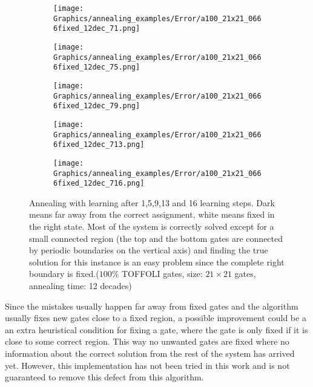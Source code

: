 \begin{figure}[hbtp]
  \centering
  \begin{subfigure}{0.18\textwidth}
    \texttt{[image: Graphics/annealing\_examples/Error/a100\_21x21\_0666fixed\_12dec\_71.png]}
  \end{subfigure}
  \begin{subfigure}{0.18\textwidth}
    \texttt{[image: Graphics/annealing\_examples/Error/a100\_21x21\_0666fixed\_12dec\_75.png]}
  \end{subfigure}
  \begin{subfigure}{0.18\textwidth}
    \texttt{[image: Graphics/annealing\_examples/Error/a100\_21x21\_0666fixed\_12dec\_79.png]}
  \end{subfigure}
  \begin{subfigure}{0.18\textwidth}
    \texttt{[image: Graphics/annealing\_examples/Error/a100\_21x21\_0666fixed\_12dec\_713.png]}
  \end{subfigure}
  \begin{subfigure}{0.18\textwidth}
    \texttt{[image: Graphics/annealing\_examples/Error/a100\_21x21\_0666fixed\_12dec\_716.png]}
  \end{subfigure}
  \caption{Annealing with learning after 1,5,9,13 and 16 learning steps. Dark means far away from the correct assignment, white means fixed in the right state. Most of the system is correctly solved except for a small connected region (the top and the bottom gates are connected by periodic boundaries on the vertical axis) and finding the true solution for this instance is an easy problem since the complete right boundary is fixed.($100\%$ TOFFOLI gates, size: $21\times 21$ gates, annealing time: 12 decades)}
  \label{fig:colorplot_mistake}
\end{figure}

Since the mistakes usually happen far away from fixed gates and the algorithm usually fixes new gates close to a fixed region, a possible improvement could be a an extra heuristical condition for fixing a gate, where the gate is only fixed if it is close to some correct region.
This way no unwanted gates are fixed where no information about the correct solution from the rest of the system has arrived yet.
However, this implementation has not been tried in this work and is not guaranteed to remove this defect from this algorithm.

